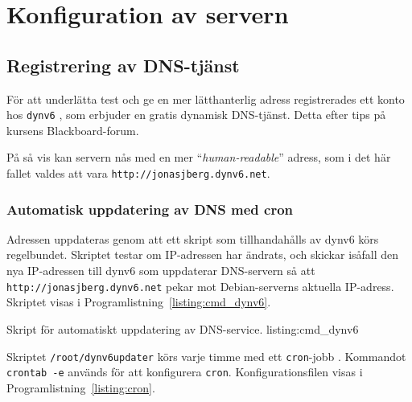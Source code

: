 %
%
%


\section{Konfiguration av servern}
\subsection{Registrering av DNS-tjänst}
För att underlätta test och ge en mer lätthanterlig adress registrerades ett
konto hos \texttt{dynv6} \cite{ipv6:dynv6}, som erbjuder en gratis dynamisk
DNS-tjänst. Detta efter tips på kursens Blackboard-forum.

På så vis kan servern nås med en mer ``\emph{human-readable}'' adress,
som i det här fallet valdes att vara \texttt{http://jonasjberg.dynv6.net}.

\subsubsection{Automatisk uppdatering av DNS med cron}
Adressen uppdateras genom att ett skript som tillhandahålls \cite{ipv6:dynv6sh}
av dynv6 körs regelbundet. Skriptet testar om IP-adressen har ändrats, och
skickar isåfall den nya IP-adressen till dynv6 som uppdaterar DNS-servern så
att \texttt{http://jonasjberg.dynv6.net} pekar mot Debian-serverns aktuella
IP-adress.  
Skriptet visas i Programlistning~\ref{listing:cmd_dynv6}.

            {Skript för automatiskt uppdatering av DNS-service.}
            {listing:cmd_dynv6}


Skriptet \texttt{/root/dynv6updater} körs varje timme med ett
\texttt{cron}-jobb \cite{misc:crontutorial} \cite{misc:cronintro}.  Kommandot
\texttt{crontab -e} används för att konfigurera \texttt{cron}.
Konfigurationsfilen visas i Programlistning~\ref{listing:cron}.

